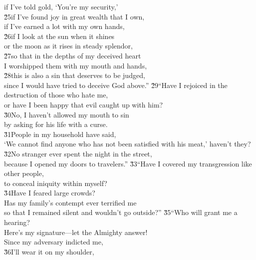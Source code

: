 \begin{poetry}
\poemll    if I've told gold, `You're my security,' \\
\poeml \v{25}if I've found joy in great wealth that I own, \\
\poemll    if I've earned a lot with my own hands, \\
\poeml \v{26}if I look at the sun when it shines \\
\poemll    or the moon as it rises in steady splendor, \\
\poeml \v{27}so that in the depths of my deceived heart \\
\poemll    I worshipped them with my mouth and hands, \\
\poeml \v{28}this is also a sin that deserves to be judged, \\
\poemll    since I would have tried to deceive God above.''
\poeml \v{29}``Have I rejoiced in the destruction of those who hate me, \\
\poemll    or have I been happy that evil caught up with him? \\
\poeml \v{30}No, I haven't allowed my mouth to sin \\
\poemll    by asking for his life with a curse. \\
\poeml \v{31}People in my household have said, \\
\poemll    `We cannot find anyone who has not been satisfied with his meat,' haven't they? \\
\poeml \v{32}No stranger ever spent the night in the street, \\
\poemll    because I opened my doors to travelers.''
\poeml \v{33}``Have I covered my transgression like other people, \\
\poemll    to conceal iniquity within myself? \\
\poeml \v{34}Have I feared large crowds? \\
\poemll    Has my family's contempt ever terrified me \\
\poemlll       so that I remained silent and wouldn't go outside?''
\poeml \v{35}``Who will grant me a hearing? \\
\poemll    Here's my signature---let the Almighty answer! \\
\poeml Since my adversary indicted me, \\
\poeml \v{36}I'll wear it on my shoulder, \\

\end{poetry}
